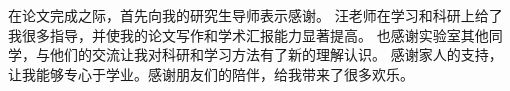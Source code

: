 
\begin{acknowledgements}
  在论文完成之际，首先向我的研究生导师表示感谢。
  汪老师在学习和科研上给了我很多指导，并使我的论文写作和学术汇报能力显著提高。
  也感谢实验室其他同学，与他们的交流让我对科研和学习方法有了新的理解认识。
  感谢家人的支持，让我能够专心于学业。感谢朋友们的陪伴，给我带来了很多欢乐。
\end{acknowledgements}
